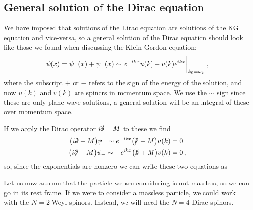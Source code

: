 \documentclass[main.tex]{subfiles}
\begin{document}

\subsection{General solution of the Dirac equation}

We have imposed that solutions of the Dirac equation are solutions of the KG equation and vice-versa, so a general solution of the Dirac equation should look like those we found when discussing the Klein-Gordon equation: 
%
\begin{align}
\psi (x) = \psi_{+ } (x) + \psi_{-} (x) 
\sim \eval{e^{-ikx} u(k) + v(k) e^{ikx}}_{k_0 = \omega_{k}}
\,,
\end{align}
%
where the subscript \(+\) or \(-\) refers to the sign of the energy of the solution, and now \(u(k)\) and \(v(k)\) are spinors in momentum space. 
We use the \(\sim\) sign since these are only plane wave solutions, a general solution will be an integral of these over momentum space.

If we apply the Dirac operator \(i \slashed{\partial} - M\) to these we find 
%
\begin{subequations}
\begin{align}
\qty( i \slashed{\partial} - M) \psi_{+} \sim e^{-ikx} \qty(\slashed{k} - M) u(k) &= 0 \\
\qty( i \slashed{\partial} - M) \psi_{-} \sim -e^{ikx} \qty(\slashed{k} + M) v(k) &= 0
\,,
\end{align}
\end{subequations}
%
so, since the exponentials are nonzero we can write these two equations as 
%

Let us now assume that the particle we are considering is not massless, so we can go in its rest frame. 
If we were to consider a massless particle, we could work with the \(N=2\) Weyl spinors. Instead, we will need the \(N=4\) Dirac spinors. 
\end{document}
